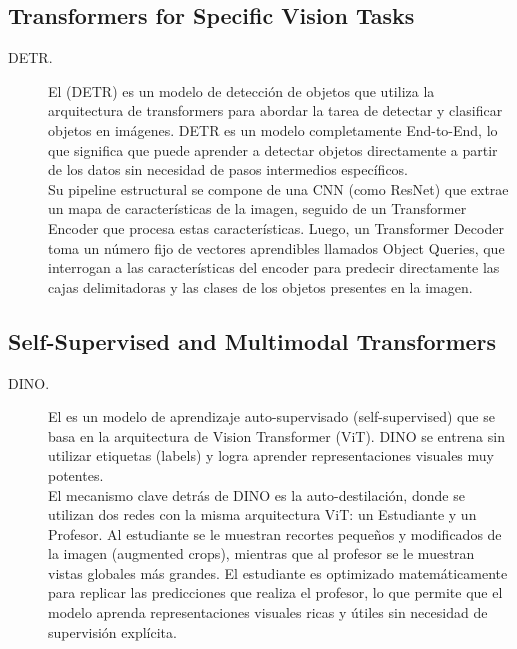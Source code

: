 \subsection{Transformers for Specific Vision Tasks}

\begin{description}
    \item[DETR.]  El  (DETR) es un modelo de detección de objetos que utiliza la arquitectura de transformers para abordar la tarea de detectar y clasificar objetos en imágenes. DETR es un modelo completamente End-to-End, lo que significa que puede aprender a detectar objetos directamente a partir de los datos sin necesidad de pasos intermedios específicos. \\
    \noindent
    Su pipeline estructural se compone de una CNN (como ResNet) que extrae un mapa de características de la imagen, seguido de un Transformer Encoder que procesa estas características. Luego, un Transformer Decoder toma un número fijo de vectores aprendibles llamados Object Queries, que interrogan a las características del encoder para predecir directamente las cajas delimitadoras y las clases de los objetos presentes en la imagen. \\
\end{description}

\subsection{Self-Supervised and Multimodal Transformers}

\begin{description}
    \item[DINO.] El  es un modelo de aprendizaje auto-supervisado (self-supervised) que se basa en la arquitectura de Vision Transformer (ViT). DINO se entrena sin utilizar etiquetas (labels) y logra aprender representaciones visuales muy potentes. \\ 
    \noindent
    El mecanismo clave detrás de DINO es la auto-destilación, donde se utilizan dos redes con la misma arquitectura ViT: un Estudiante y un Profesor. Al estudiante se le muestran recortes pequeños y modificados de la imagen (augmented crops), mientras que al profesor se le muestran vistas globales más grandes. El estudiante es optimizado matemáticamente para replicar las predicciones que realiza el profesor, lo que permite que el modelo aprenda representaciones visuales ricas y útiles sin necesidad de supervisión explícita.
\end{description}

